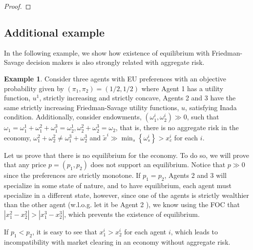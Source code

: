 \documentclass[pdftex]{article}
\numberwithin{equation}{section}
\theoremstyle{th}
\newtheorem{proof lemma}{{Proof Lemma}.}
\theoremstyle{definition}
\newtheorem{example}{Example}%
\begin{document}
{\begin{proof}
\end{proof}


\subsection{Additional example}
\label{appex}

In the following example, we show how existence of equilibrium with Friedman-Savage decision makers is also strongly related with aggregate risk.
\begin{example}
\label{exFSne}
Consider three agents with EU preferences with an objective probability given by $(\pi_1,\pi_2)=(1/2,1/2)$ where Agent 1 has a utility function, $u^1$, strictly increasing and strictly concave, Agents 2 and 3 have the same strictly increasing Friedman-Savage utility functions, $u$, satisfying Inada condition. Additionally, consider endowments, $\left(\omega^i_1,\omega^i_2\right)\gg0$, such that $\omega_1=\omega^1_1+\omega^2_1+\omega^3_1=\omega^1_2,\omega^2_2+\omega^3_2=\omega_2$, that is, there is no aggregate risk in the economy, $\omega^2_1+\omega^2_2\neq\omega^3_1+\omega^3_2$ and $\tilde{x}^i\gg\min_s\left\{\omega^i_s\right\}>x^i_c$ for each $i$.

Let us prove that there is no equilibrium for the economy. To do so, we will prove that any price $p=(p_1,p_2)$ does not support an equilibrium. Notice that $p\gg0$ since the preferences are strictly monotone. If $p_1=p_2$, Agents 2 and 3 will specialize in some state of nature, and to have equilibrium, each agent must specialize in a different state, however, since one of the agents is strictly wealthier than the other agent (w.l.o.g. let it be Agent 2 ), we know using the FOC that $\left|x^2_1-x^2_2\right|>\left|x^3_1-x^3_2\right|$, which prevents the existence of equilibrium.

If $p_1<p_2$, it is easy to see that $x^i_1>x^i_2$ for each agent $i$, which leads to incompatibility with market clearing in an economy without aggregate risk.

\end{example}





}
\end{document}
